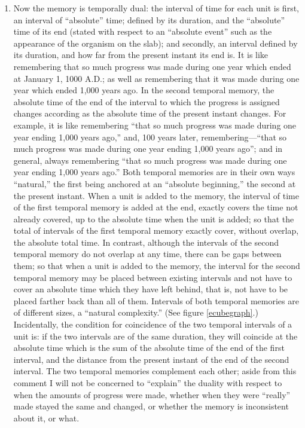 \begin{enumerate}[wide, nosep, itemsep=0.5em]
\item Now the memory is temporally dual: the interval of time for each 
unit is first, an interval of \enquote{absolute} time; defined by its duration, and the 
\enquote{absolute} time of its end (stated with respect to an \enquote{absolute event} such 
as the appearance of the organism on the slab); and secondly, an interval 
defined by its duration, and how far from the present instant its end is. It is 
like remembering that so much progress was made during one year which 
ended at January 1, 1000 A.D.; as well as remembering that it was made 
during one year which ended 1,000 years ago. In the second temporal 
memory, the absolute time of the end of the interval to which the progress is 
assigned changes according as the absolute time of the present instant 
changes. For example, it is like remembering \enquote{that so much progress was 
made during one year ending 1,000 years ago,} and, 100 years later, 
remembering---\enquote{that so much progress was made during one year ending 
1,000 years ago}; and in general, always remembering \enquote{that so much 
progress was made during one year ending 1,000 years ago.} Both temporal 
memories are in their own ways \enquote{natural,} the first being anchored at an 
\enquote{absolute beginning,} the second at the present instant. When a unit is added 
to the memory, the interval of time of the first temporal memory is added at 
the end, exactly covers the time not already covered, up to the absolute time 
when the unit is added; so that the total of intervals of the first temporal 
memory exactly cover, without overlap, the absolute total time. In contrast, 
although the intervals of the second temporal memory do not overlap at any 
time, there can be gaps between them; so that when a unit is added to the 
memory, the interval for the second temporal memory may be placed 
between existing intervals and not have to cover an absolute time which they 
have left behind, that is, not have to be placed farther back than all of them. 
Intervals of both temporal memories are of different sizes, a \enquote{natural 
complexity.} (See figure \ref{ecubegraph}.) Incidentally, the condition for coincidence of 
the two temporal intervals of a unit is: if the two intervals are of the same 
duration, they will coincide at the absolute time which is the sum of the 
absolute time of the end of the first interval, and the distance from the 
present instant of the end of the second interval. The two temporal 
memories complement each other; aside from this comment I will not be 
concerned to \enquote{explain} the duality with respect to when the amounts of 
progress were made, whether when they were \enquote{really} made stayed the same 
and changed, or whether the memory is inconsistent about it, or what. 


\end{enumerate}
